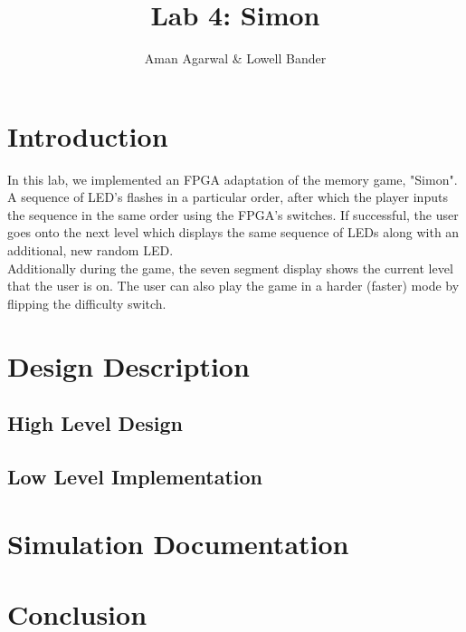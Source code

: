\documentclass[]{article}
\newcommand{\subtitle}[1]{%
  \posttitle{%
    \par\end{center}
    \begin{center}\large#1\end{center}
    \vskip0.5em}%
}
\begin{document}
\title{Lab 4: Simon}
\subtitle{CS M152A}
\author{Aman Agarwal \& Lowell Bander}

\maketitle
\tableofcontents

\newpage

\section{Introduction}

In this lab, we implemented an FPGA adaptation of the memory game, "Simon". A sequence of LED's flashes in a particular order, after which the player inputs the sequence in the same order using the FPGA's switches. If successful, the user goes onto the next level which displays the same sequence of LEDs along with an additional, new random LED. \\

Additionally during the game, the seven segment display shows the current level that the user is on. The user can also play the game in a harder (faster) mode by flipping the difficulty switch.

\section{Design Description}

\subsection{High Level Design}
\label{subsec:highlevel}

\subsection{Low Level Implementation}


\section{Simulation Documentation}


\section{Conclusion}
\end{document}
